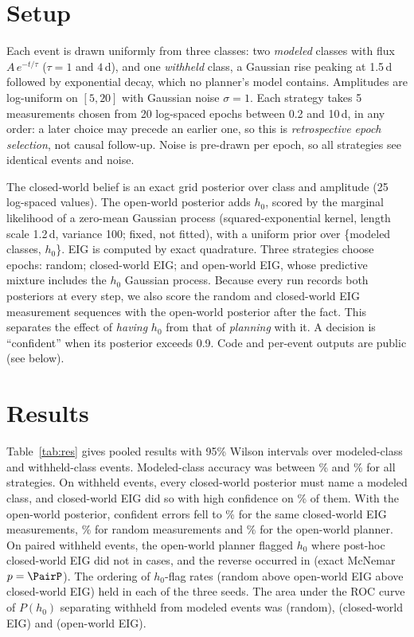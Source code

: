 \documentclass{aastex701}
\begin{document}
\section{Setup}
Each event is drawn uniformly from three classes: two \emph{modeled} classes with flux $A\,e^{-t/\tau}$ ($\tau = 1$ and $4$\,d), and one \emph{withheld} class, a Gaussian rise peaking at 1.5\,d followed by exponential decay, which no planner's model contains. Amplitudes are log-uniform on $[5, 20]$ with Gaussian noise $\sigma = 1$. Each strategy takes 5 measurements chosen from 20 log-spaced epochs between 0.2 and 10\,d, in any order: a later choice may precede an earlier one, so this is \emph{retrospective epoch selection}, not causal follow-up. Noise is pre-drawn per epoch, so all strategies see identical events and noise.

The closed-world belief is an exact grid posterior over class and amplitude (25 log-spaced values). The open-world posterior adds $h_0$, scored by the marginal likelihood of a zero-mean Gaussian process (squared-exponential kernel, length scale 1.2\,d, variance 100; fixed, not fitted), with a uniform prior over \{modeled classes, $h_0$\}. EIG is computed by exact quadrature. Three strategies choose epochs: random; closed-world EIG; and open-world EIG, whose predictive mixture includes the $h_0$ Gaussian process. Because every run records both posteriors at every step, we also score the random and closed-world EIG measurement sequences with the open-world posterior after the fact. This separates the effect of \emph{having} $h_0$ from that of \emph{planning} with it. A decision is ``confident'' when its posterior exceeds 0.9. Code and per-event outputs are public (see below).

\section{Results}
Table~\ref{tab:res} gives pooled results with 95\% Wilson intervals over \NModeled{} modeled-class and \NWithheld{} withheld-class events. Modeled-class accuracy was between \RndHAccMod\% and \BAccMod\% for all strategies. On withheld events, every closed-world posterior must name a modeled class, and closed-world EIG did so with high confidence on \BCwWith\% of them. With the open-world posterior, confident errors fell to \BHCwWith\% for the same closed-world EIG measurements, \RndHCwWith\% for random measurements and \PCwWith\% for the open-world planner. On paired withheld events, the open-world planner flagged $h_0$ where post-hoc closed-world EIG did not in \PairPOnly{} cases, and the reverse occurred in \PairBOnly{} (exact McNemar $p = \PairP$). The ordering of $h_0$-flag rates (random above open-world EIG above closed-world EIG) held in each of the three seeds. The area under the ROC curve of $P(h_0)$ separating withheld from modeled events was \RndHAuroc{} (random), \BHAuroc{} (closed-world EIG) and \PAuroc{} (open-world EIG).
\end{document}
